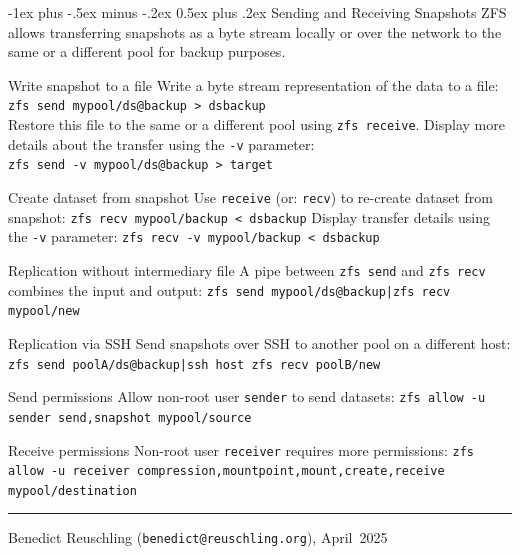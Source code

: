 \documentclass[10pt,landscape,letter]{article}
\makeatletter
\renewcommand{\section}{\@startsection{section}{1}{0mm}%
                                {-1ex plus -.5ex minus -.2ex}%
                                {0.5ex plus .2ex}%
                                {\normalfont\large\bfseries}}
\makeatother
\begin{document}
\begin{multicols}{3}
	\section{Sending and Receiving Snapshots}
  ZFS allows transferring snapshots as a byte stream locally or over the
  network to the same or a different pool for backup purposes.
	\begin{Description}
    \item[Write snapshot to a file] Write a byte stream representation of the data to a file:
      \texttt{zfs send mypool/ds@backup > dsbackup}\\
      Restore this file to the same or a different
      pool using \texttt{zfs receive}. Display more details about the
      transfer using the \texttt{-v} parameter:\\
      \texttt{zfs send -v mypool/ds@backup > target}
    \item[Create dataset from snapshot] Use \texttt{receive} (or: \texttt{recv}) to re-create dataset from snapshot:
      \texttt{zfs recv mypool/backup < dsbackup}
      Display transfer details using the \texttt{-v} parameter: \texttt{zfs recv -v
      mypool/backup < dsbackup}
    \item[Replication without intermediary file] A pipe between \texttt{zfs
      send} and \texttt{zfs recv} combines the input and output: \texttt{zfs send
      mypool/ds@backup|zfs recv mypool/new}
    \item[Replication via SSH] Send snapshots over SSH to another pool on a different host:
      \texttt{zfs send poolA/ds@backup|ssh host zfs recv poolB/new}\\
    \item[Send permissions] Allow non-root user \texttt{sender} to send
      datasets: \texttt{zfs allow -u sender send,snapshot mypool/source}
    \item[Receive permissions] Non-root user \texttt{receiver} requires more
      permissions: \texttt{zfs allow -u receiver
      compression,mountpoint,mount,create,receive mypool/destination}
  \end{Description}


	\vfill

	\hrule
	Benedict Reuschling (\texttt{benedict@reuschling.org}), April~2025
	\newpage

\end{multicols}
\end{document}
